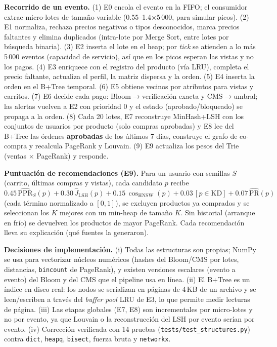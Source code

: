 \textbf{Recorrido de un evento.} (1) E0 encola el evento en la FIFO; el consumidor extrae micro-lotes de tamaño variable (0.55–1.4$\times$5\,000, para simular
picos). (2) E1 normaliza, rechaza precios negativos o tipos desconocidos, marca precios faltantes y elimina duplicados (intra-lote por Merge Sort, entre lotes por
búsqueda binaria). (3) E2 inserta el lote en el heap; por \emph{tick} se atienden a lo más 5\,000 eventos (capacidad de servicio), así que en los picos esperan
las vistas y no los pagos. (4) E3 enriquece con el registro del producto (vía LRU), completa el precio faltante, actualiza el perfil, la matriz dispersa y la
orden. (5) E4 inserta la orden en el B+Tree temporal. (6) E5 obtiene vecinos por atributos para vistas y carritos. (7) E6 decide cada pago: Bloom$\to$verificación
exacta y CMS$\to$umbral; las alertas vuelven a E2 con prioridad 0 y el estado (aprobado/bloqueado) se propaga a la orden. (8) Cada 20 lotes, E7 reconstruye
MinHash+LSH con los conjuntos de usuarios por producto (solo compras aprobadas) y E8 lee del B+Tree las órdenes \textbf{aprobadas} de los últimos 7 días,
construye el grafo de co-compra y recalcula PageRank y Louvain. (9) E9 actualiza los pesos del Trie (ventas $\times$ PageRank) y responde.

\textbf{Puntuación de recomendaciones (E9).} Para un usuario con semillas $S$ (carrito, últimas compras y vistas), cada candidato $p$ recibe
$0.45\,\widehat{\mathrm{PPR}}_S(p)+0.30\,\hat J_{\mathrm{LSH}}(p)+0.15\,\cos_{\mathrm{HNSW}}(p)+0.03\,[p\in\mathrm{KD}]+0.07\,\widehat{\mathrm{PR}}(p)$
(cada término normalizado a $[0,1]$), se excluyen productos ya comprados y se seleccionan los $K$ mejores con un min-heap de tamaño $K$. Sin historial
(arranque en frío) se devuelven los productos de mayor PageRank. Cada recomendación lleva su explicación (qué fuentes la generaron).

\textbf{Decisiones de implementación.} (i) Todas las estructuras son propias; NumPy se usa para vectorizar núcleos numéricos (hashes del Bloom/CMS por lotes, distancias,
\texttt{bincount} de PageRank), y existen versiones escalares (evento a evento) del Bloom y del CMS que el pipeline usa en línea. (ii) El B+Tree es un índice en
disco real: los nodos se serializan en páginas de 4\,KB de un archivo y se leen/escriben a través del \emph{buffer pool} LRU de E3, lo que permite medir lecturas de página.
(iii) Las etapas globales (E7, E8) son incrementales por micro-lotes y no por evento, ya que Louvain o la reconstrucción del LSH por evento serían
 por evento. (iv) Corrección verificada con 14 pruebas (\texttt{tests/test\_structures.py}) contra \texttt{dict}, \texttt{heapq}, \texttt{bisect},
fuerza bruta y \texttt{networkx}.

